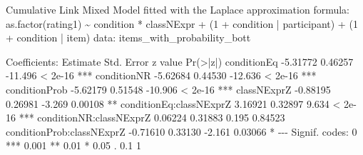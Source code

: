\documentclass[
  letterpaper,
  DIV=11,
  numbers=noendperiod]{scrartcl}
\newenvironment{Shaded}{\begin{snugshade}}{\end{snugshade}}
\newcommand{\DecValTok}[1]{\textcolor[rgb]{0.68,0.00,0.00}{#1}}
\newcommand{\ErrorTok}[1]{\textcolor[rgb]{0.68,0.00,0.00}{#1}}
\newcommand{\FloatTok}[1]{\textcolor[rgb]{0.68,0.00,0.00}{#1}}
\newcommand{\FunctionTok}[1]{\textcolor[rgb]{0.28,0.35,0.67}{#1}}
\newcommand{\NormalTok}[1]{\textcolor[rgb]{0.00,0.23,0.31}{#1}}
\newcommand{\SpecialCharTok}[1]{\textcolor[rgb]{0.37,0.37,0.37}{#1}}
\newcommand{\StringTok}[1]{\textcolor[rgb]{0.13,0.47,0.30}{#1}}
\begin{document}
\begin{Shaded}
\begin{Highlighting}[]
\NormalTok{Cumulative Link Mixed Model fitted with the Laplace approximation}
\NormalTok{formula}\SpecialCharTok{:} \FunctionTok{as.factor}\NormalTok{(rating1) }\SpecialCharTok{\textasciitilde{}}\NormalTok{ condition }\SpecialCharTok{*}\NormalTok{ classNExpr }\SpecialCharTok{+}\NormalTok{ (}\DecValTok{1} \SpecialCharTok{+}\NormalTok{ condition }\SpecialCharTok{|}  
\NormalTok{  participant) }\SpecialCharTok{+}\NormalTok{ (}\DecValTok{1} \SpecialCharTok{+}\NormalTok{ condition }\SpecialCharTok{|}\NormalTok{ item)}
\NormalTok{  data}\SpecialCharTok{:}\NormalTok{    items\_with\_probability\_bott}

\NormalTok{Coefficients}\SpecialCharTok{:}
\NormalTok{                           Estimate Std. Error z value }\FunctionTok{Pr}\NormalTok{(}\SpecialCharTok{\textgreater{}}\ErrorTok{|}\NormalTok{z}\SpecialCharTok{|}\NormalTok{)    }
\NormalTok{conditionEq               }\SpecialCharTok{{-}}\FloatTok{5.31772}    \FloatTok{0.46257} \SpecialCharTok{{-}}\FloatTok{11.496}  \SpecialCharTok{\textless{}} \FloatTok{2e{-}16} \SpecialCharTok{**}\ErrorTok{*}
\NormalTok{conditionNR               }\SpecialCharTok{{-}}\FloatTok{5.62684}    \FloatTok{0.44530} \SpecialCharTok{{-}}\FloatTok{12.636}  \SpecialCharTok{\textless{}} \FloatTok{2e{-}16} \SpecialCharTok{**}\ErrorTok{*}
\NormalTok{conditionProb             }\SpecialCharTok{{-}}\FloatTok{5.62179}    \FloatTok{0.51548} \SpecialCharTok{{-}}\FloatTok{10.906}  \SpecialCharTok{\textless{}} \FloatTok{2e{-}16} \SpecialCharTok{**}\ErrorTok{*}
\NormalTok{classNExprZ               }\SpecialCharTok{{-}}\FloatTok{0.88195}    \FloatTok{0.26981}  \SpecialCharTok{{-}}\FloatTok{3.269}  \FloatTok{0.00108} \SpecialCharTok{**} 
\NormalTok{conditionEq}\SpecialCharTok{:}\NormalTok{classNExprZ    }\FloatTok{3.16921}    \FloatTok{0.32897}   \FloatTok{9.634}  \SpecialCharTok{\textless{}} \FloatTok{2e{-}16} \SpecialCharTok{**}\ErrorTok{*}
\NormalTok{conditionNR}\SpecialCharTok{:}\NormalTok{classNExprZ    }\FloatTok{0.06224}    \FloatTok{0.31883}   \FloatTok{0.195}  \FloatTok{0.84523}    
\NormalTok{conditionProb}\SpecialCharTok{:}\NormalTok{classNExprZ }\SpecialCharTok{{-}}\FloatTok{0.71610}    \FloatTok{0.33130}  \SpecialCharTok{{-}}\FloatTok{2.161}  \FloatTok{0.03066} \SpecialCharTok{*}  
\SpecialCharTok{{-}{-}{-}}
\NormalTok{Signif. codes}\SpecialCharTok{:}  \DecValTok{0} \StringTok{\textquotesingle{}***\textquotesingle{}} \FloatTok{0.001} \StringTok{\textquotesingle{}**\textquotesingle{}} \FloatTok{0.01} \StringTok{\textquotesingle{}*\textquotesingle{}} \FloatTok{0.05} \StringTok{\textquotesingle{}.\textquotesingle{}} \FloatTok{0.1} \StringTok{\textquotesingle{} \textquotesingle{}} \DecValTok{1}\StringTok{\textasciigrave{}\textasciigrave{}\textasciigrave{}}
\end{Highlighting}
\end{Shaded}
\end{document}
